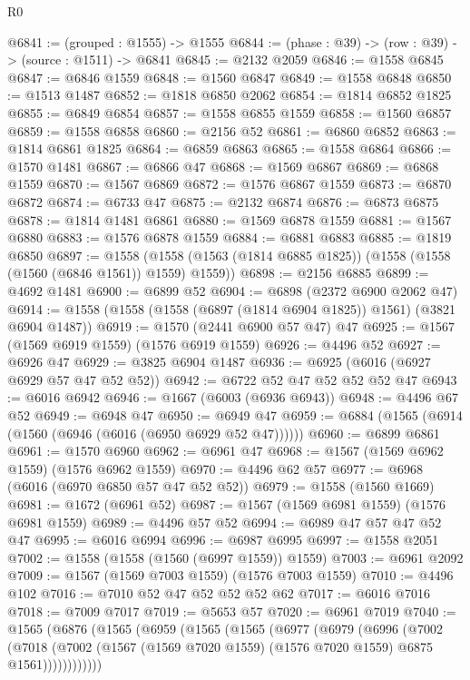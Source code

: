 \begin{lexlean}{R0}
\begin{coremodule}
@6841 := (grouped : @1555) -> @1555
@6844 := (phase : @39) -> (row : @39) -> (source : @1511) -> @6841
@6845 := @2132 @2059
@6846 := @1558 @6845
@6847 := @6846 @1559
@6848 := @1560 @6847
@6849 := @1558 @6848
@6850 := @1513 @1487
@6852 := @1818 @6850 @2062
@6854 := @1814 @6852 @1825
@6855 := @6849 @6854
@6857 := @1558 @6855 @1559
@6858 := @1560 @6857
@6859 := @1558 @6858
@6860 := @2156 @52
@6861 := @6860 @6852
@6863 := @1814 @6861 @1825
@6864 := @6859 @6863
@6865 := @1558 @6864
@6866 := @1570 @1481
@6867 := @6866 @47
@6868 := @1569 @6867
@6869 := @6868 @1559
@6870 := @1567 @6869
@6872 := @1576 @6867 @1559
@6873 := @6870 @6872
@6874 := @6733 @47
@6875 := @2132 @6874
@6876 := @6873 @6875
@6878 := @1814 @1481 @6861
@6880 := @1569 @6878 @1559
@6881 := @1567 @6880
@6883 := @1576 @6878 @1559
@6884 := @6881 @6883
@6885 := @1819 @6850
@6897 := @1558 (@1558 (@1563 (@1814 @6885 @1825)) (@1558 (@1558 (@1560 (@6846 @1561)) @1559) @1559))
@6898 := @2156 @6885
@6899 := @4692 @1481
@6900 := @6899 @52
@6904 := @6898 (@2372 @6900 @2062 @47)
@6914 := @1558 (@1558 (@1558 (@6897 (@1814 @6904 @1825)) @1561) (@3821 @6904 @1487))
@6919 := @1570 (@2441 @6900 @57 @47) @47
@6925 := @1567 (@1569 @6919 @1559) (@1576 @6919 @1559)
@6926 := @4496 @52
@6927 := @6926 @47
@6929 := @3825 @6904 @1487
@6936 := @6925 (@6016 (@6927 @6929 @57 @47 @52 @52))
@6942 := @6722 @52 @47 @52 @52 @52 @47
@6943 := @6016 @6942
@6946 := @1667 (@6003 (@6936 @6943))
@6948 := @4496 @67 @52
@6949 := @6948 @47
@6950 := @6949 @47
@6959 := @6884 (@1565 (@6914 (@1560 (@6946 (@6016 (@6950 @6929 @52 @47))))))
@6960 := @6899 @6861
@6961 := @1570 @6960
@6962 := @6961 @47
@6968 := @1567 (@1569 @6962 @1559) (@1576 @6962 @1559)
@6970 := @4496 @62 @57
@6977 := @6968 (@6016 (@6970 @6850 @57 @47 @52 @52))
@6979 := @1558 (@1560 @1669)
@6981 := @1672 (@6961 @52)
@6987 := @1567 (@1569 @6981 @1559) (@1576 @6981 @1559)
@6989 := @4496 @57 @52
@6994 := @6989 @47 @57 @47 @52 @47
@6995 := @6016 @6994
@6996 := @6987 @6995
@6997 := @1558 @2051
@7002 := @1558 (@1558 (@1560 (@6997 @1559)) @1559)
@7003 := @6961 @2092
@7009 := @1567 (@1569 @7003 @1559) (@1576 @7003 @1559)
@7010 := @4496 @102
@7016 := @7010 @52 @47 @52 @52 @52 @62
@7017 := @6016 @7016
@7018 := @7009 @7017
@7019 := @5653 @57
@7020 := @6961 @7019
@7040 := @1565
    (@6876
      (@1565
        (@6959
          (@1565
            (@1565
              (@6977
                (@6979
                  (@6996
                    (@7002
                      (@7018
                        (@7002
                          (@1567 (@1569 @7020 @1559) (@1576 @7020 @1559) @6875 @1561))))))))))))

\end{coremodule}
\end{lexlean}
